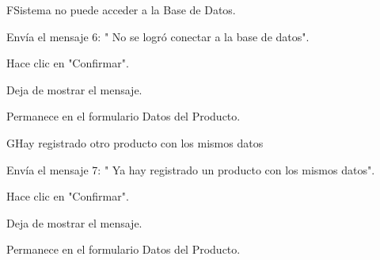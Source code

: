 \begin{UCtrayectoriaA}{F}{Sistema no puede acceder a la Base de Datos.}
	
	\UCpaso[\UCsist] Envía el mensaje 6: " No se logró conectar a la base de datos".
	
	\UCpaso[\UCactor] Hace clic en "Confirmar".

	\UCpaso[\UCsist] Deja de mostrar el mensaje.

	\UCpaso[] Permanece en el formulario Datos del Producto.

\end{UCtrayectoriaA}
\begin{UCtrayectoriaA}{G}{Hay registrado otro producto con los mismos datos}
	
	\UCpaso[\UCsist] Envía el mensaje 7: " Ya hay registrado un producto con los mismos datos".
	
	\UCpaso[\UCactor] Hace clic en "Confirmar".

	\UCpaso[\UCsist] Deja de mostrar el mensaje.

	\UCpaso[] Permanece en el formulario Datos del Producto.

\end{UCtrayectoriaA}
